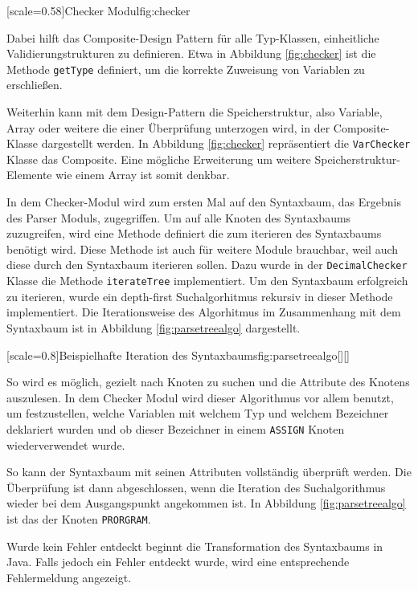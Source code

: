 [scale=0.58]{Checker Modul}{fig:checker}
\pagebreak

Dabei hilft das Composite-Design Pattern für alle Typ-Klassen, einheitliche Validierungstrukturen zu definieren.
Etwa in Abbildung \ref{fig:checker} ist die Methode \verb+getType+ definiert, um die korrekte Zuweisung von Variablen zu erschließen. 

Weiterhin kann mit dem Design-Pattern die Speicherstruktur, also Variable, Array oder weitere die einer Überprüfung unterzogen wird, in der Composite-Klasse dargestellt werden.
In Abbildung \ref{fig:checker} repräsentiert die \verb+VarChecker+ Klasse das Composite.
Eine mögliche Erweiterung um weitere Speicherstruktur-Elemente wie einem Array ist somit denkbar.

In dem Checker-Modul wird zum ersten Mal auf den Syntaxbaum, das Ergebnis des Parser Moduls, zugegriffen.
Um auf alle Knoten des Syntaxbaums zuzugreifen, wird eine Methode definiert die zum iterieren des Syntaxbaums benötigt wird.
Diese Methode ist auch für weitere Module brauchbar, weil auch diese durch den Syntaxbaum iterieren sollen.
Dazu wurde in der \verb+DecimalChecker+ Klasse die Methode \verb+iterateTree+ implementiert.
Um den Syntaxbaum erfolgreich zu iterieren, wurde ein depth-first Suchalgorhitmus rekursiv in dieser Methode implementiert.
Die Iterationsweise des Algorhitmus im Zusammenhang mit dem Syntaxbaum ist in Abbildung \ref{fig:parsetreealgo} dargestellt.

[scale=0.8]{Beispielhafte Iteration des Syntaxbaums}{fig:parsetreealgo}[][]
\pagebreak

So wird es möglich, gezielt nach Knoten zu suchen und die Attribute des Knotens auszulesen.
In dem Checker Modul wird dieser Algorithmus vor allem benutzt, um festzustellen, welche Variablen mit welchem Typ und welchem Bezeichner deklariert wurden und ob dieser Bezeichner in einem \verb+ASSIGN+ Knoten wiederverwendet wurde.

So kann der Syntaxbaum mit seinen Attributen vollständig überprüft werden.
Die Überprüfung ist dann abgeschlossen, wenn die Iteration des Suchalgorithmus wieder bei dem Ausgangspunkt angekommen ist. In Abbildung \ref{fig:parsetreealgo} ist das der Knoten \verb+PRORGRAM+.

Wurde kein Fehler entdeckt beginnt die Transformation des Syntaxbaums in Java. Falls jedoch ein Fehler entdeckt wurde, wird eine entsprechende Fehlermeldung angezeigt.

